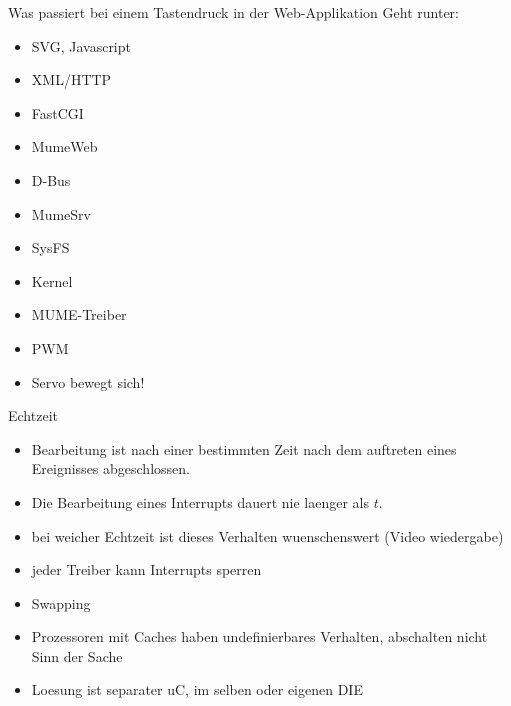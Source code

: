 \begin{frame}{Was passiert bei einem Tastendruck in der Web-Applikation}
	Geht runter:
	\begin{itemize}
		\item SVG, Javascript
		\item XML/HTTP
		\item FastCGI
		\item MumeWeb
		\item D-Bus
		\item MumeSrv
		\item SysFS
		\item Kernel
		\item MUME-Treiber
		\item PWM
		\item Servo bewegt sich!
	\end{itemize}
\end{frame}

\begin{frame}{Echtzeit}
	\begin{itemize}
		\item Bearbeitung ist nach einer bestimmten Zeit nach dem auftreten eines Ereignisses abgeschlossen.
		\item Die Bearbeitung eines Interrupts dauert nie laenger als $t$.
		\item bei weicher Echtzeit ist dieses Verhalten wuenschenswert (Video wiedergabe)
		\item jeder Treiber kann Interrupts sperren
		\item Swapping
		\item Prozessoren mit Caches haben undefinierbares Verhalten, abschalten nicht Sinn der Sache
		\item Loesung ist separater uC, im selben oder eigenen DIE
	\end{itemize}
\end{frame}
